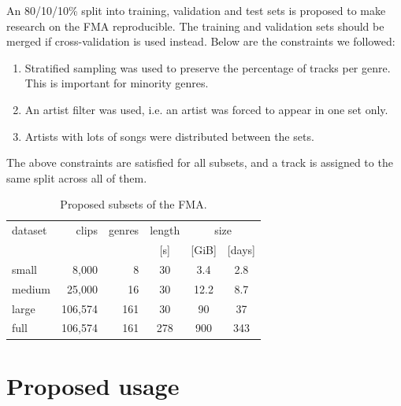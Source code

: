 \documentclass{article}
\newcommand{\ntracks}{106,574 }
\newcommand{\tduration}{343 }
\newcommand{\aduration}{278 }
\newcommand{\size}{900 }
\begin{document}
An 80/10/10\% split into training, validation and test sets is proposed to make research on the FMA reproducible. The training and validation sets should be merged if cross-validation is used instead.
Below are the constraints we followed:
\begin{enumerate}
	\item Stratified sampling was used to preserve the percentage of tracks per genre. This is important for minority genres.
	\item An artist filter was used, i.e. an artist was forced to appear in one set only. %
	\item Artists with lots of songs were distributed between the sets. %
\end{enumerate}
The above constraints are satisfied for all subsets, and a track is assigned to the same split across all of them.

\begin{table}
	\centering
	\begin{tabular}{lrrccc}
		\toprule
		dataset & clips & genres & length & \multicolumn{2}{c}{size} \\
		\cmidrule{5-6}
		        &       &        &  [s]   & [GiB] & [days] \\
		\midrule
		small  &    8,000 &   8 &  30 & 3.4  & 2.8  \\
		medium &   25,000 &  16 &  30 & 12.2 & 8.7  \\
		large  & \ntracks & 161 &  30 & 90   & 37 \\
		full   & \ntracks & 161 & \aduration & \size & \tduration  \\
		\bottomrule
	\end{tabular}
	\caption{Proposed subsets of the FMA.}
	\label{tab:subsets}
\end{table}


\section{Proposed usage} %
\end{document}
